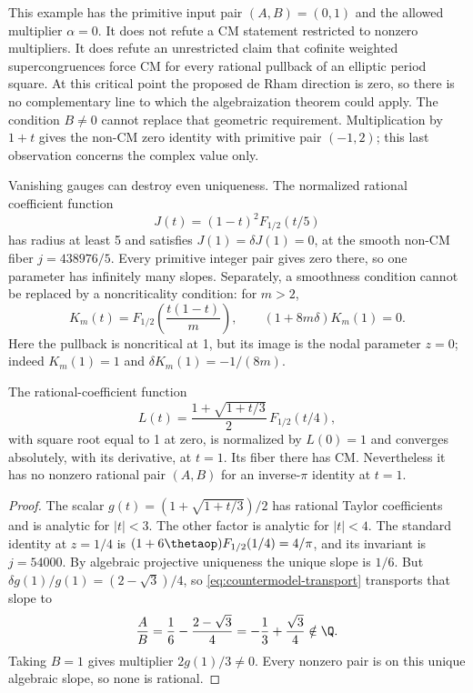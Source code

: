 This example has the primitive input pair $(A,B)=(0,1)$ and the
allowed multiplier $\alpha=0$. It does not refute a CM statement
restricted to nonzero multipliers. It does refute an unrestricted
claim that cofinite weighted supercongruences force CM for every
rational pullback of an elliptic period square. At this critical
point the proposed de Rham direction is zero, so there is no
complementary line to which the algebraization theorem could apply.
The condition $B\ne0$ cannot replace that geometric requirement.
Multiplication by $1+t$ gives the non-CM zero identity with primitive
pair $(-1,2)$; this last observation concerns the complex value only.

Vanishing gauges can destroy even uniqueness. The normalized rational
coefficient function
\[
 J(t)=(1-t)^2F_{1/2}(t/5)
\]
has radius at least 5 and satisfies $J(1)=\delta J(1)=0$, at the
smooth non-CM fiber $j=438976/5$. Every primitive integer pair gives
zero there, so one parameter has infinitely many slopes.
Separately, a smoothness condition cannot be replaced by a
noncriticality condition: for $m>2$,
\[
 K_m(t)=F_{1/2}\!\left(\frac{t(1-t)}m\right),\qquad
 (1+8m\delta)K_m(1)=0.
\]
Here the pullback is noncritical at 1, but its image is the nodal
parameter $z=0$; indeed $K_m(1)=1$ and $\delta K_m(1)=-1/(8m)$.

\begin{proposition}
\label{prop:gauge-rational-slope-countermodel}
The rational-coefficient function
\[
 L(t)=\frac{1+\sqrt{1+t/3}}2\,F_{1/2}(t/4),
\]
with square root equal to 1 at zero, is normalized by $L(0)=1$ and
converges absolutely, with its derivative, at $t=1$. Its fiber there
has CM. Nevertheless it has no nonzero rational pair $(A,B)$ for an
inverse-$\pi$ identity at $t=1$.
\end{proposition}
\begin{proof}
The scalar $g(t)=(1+\sqrt{1+t/3})/2$ has rational Taylor coefficients
and is analytic for $|t|<3$. The other factor is analytic for $|t|<4$.
The standard identity at $z=1/4$ is
$(1+6\thetaop)F_{1/2}(1/4)=4/\pi$, and its invariant is $j=54000$.
By algebraic projective uniqueness the unique slope is $1/6$.
But $\delta g(1)/g(1)=(2-\sqrt3)/4$, so
\eqref{eq:countermodel-transport} transports that slope to
\[
 \frac AB=\frac16-\frac{2-\sqrt3}{4}
 =-\frac13+\frac{\sqrt3}{4}\notin\Q.
\]
Taking $B=1$ gives multiplier $2g(1)/3\ne0$. Every nonzero pair is
on this unique algebraic slope, so none is rational.
\end{proof}

